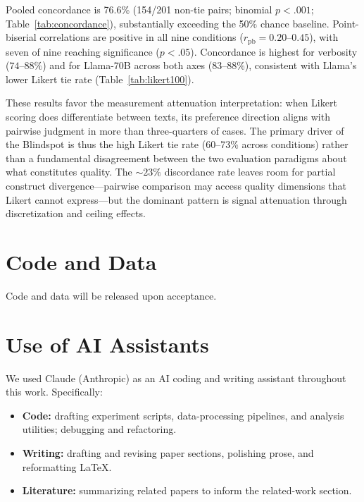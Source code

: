 Pooled concordance is 76.6\% (154/201 non-tie pairs; binomial $p < .001$; Table~\ref{tab:concordance}), substantially exceeding the 50\% chance baseline.
Point-biserial correlations are positive in all nine conditions ($r_{\text{pb}} = 0.20$--$0.45$), with seven of nine reaching significance ($p < .05$).
Concordance is highest for verbosity ($74$--$88\%$) and for Llama-70B across both axes ($83$--$88\%$), consistent with Llama's lower Likert tie rate (Table~\ref{tab:likert100}).

These results favor the measurement attenuation interpretation: when Likert scoring does differentiate between texts, its preference direction aligns with pairwise judgment in more than three-quarters of cases.
The primary driver of the Blindspot is thus the high Likert tie rate (60--73\% across conditions) rather than a fundamental disagreement between the two evaluation paradigms about what constitutes quality.
The ${\sim}23\%$ discordance rate leaves room for partial construct divergence---pairwise comparison may access quality dimensions that Likert cannot express---but the dominant pattern is signal attenuation through discretization and ceiling effects.

\section*{Code and Data}

Code and data will be released upon acceptance.

\section*{Use of AI Assistants}
\label{app:ai-assistants}

We used Claude (Anthropic) as an AI coding and writing assistant throughout this work. Specifically:
\begin{itemize}
    \item \textbf{Code:} drafting experiment scripts, data-processing pipelines, and analysis utilities; debugging and refactoring.
    \item \textbf{Writing:} drafting and revising paper sections, polishing prose, and reformatting LaTeX.
    \item \textbf{Literature:} summarizing related papers to inform the related-work section.
\end{itemize}
